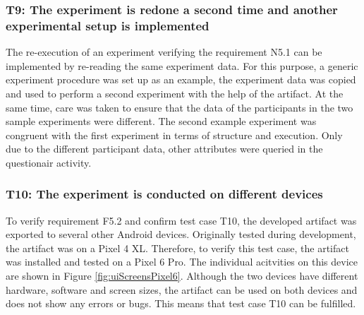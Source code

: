 \newpage

\subsubsection*{T9: The experiment is redone a second time and another experimental setup is implemented}

The re-execution of an experiment verifying the requirement N5.1 can be implemented by re-reading the same experiment data. For this purpose, a generic experiment procedure was set up as an example, the experiment data was copied and used to perform a second experiment with the help of the artifact. At the same time, care was taken to ensure that the data of the participants in the two sample experiments were different. The second example experiment was congruent with the first experiment in terms of structure and execution. Only due to the different participant data, other attributes were queried in the questionair activity.




\newpage

\subsubsection*{T10: The experiment is conducted on different devices}

To verify requirement F5.2 and confirm test case T10, the developed artifact was exported to several other Android devices. Originally tested during development, the artifact was on a Pixel 4 XL. Therefore, to verify this test case, the artifact was installed and tested on a Pixel 6 Pro. The individual acitvities on this device are shown in Figure \ref{fig:uiScreensPixel6}. Although the two devices have different hardware, software and screen sizes, the artifact can be used on both devices and does not show any errors or bugs. This means that test case T10 can be fulfilled.

